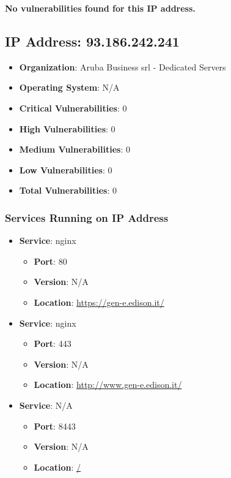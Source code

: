 \documentclass{article}
\begin{document}
\textbf{No vulnerabilities found for this IP address.}




\clearpage



\subsection{IP Address: 93.186.242.241}

\begin{itemize}
    \item \textbf{Organization}: Aruba Business srl - Dedicated Servers
    \item \textbf{Operating System}:  N/A 
    \item \textbf{Critical Vulnerabilities}: 0
    \item \textbf{High Vulnerabilities}: 0
    \item \textbf{Medium Vulnerabilities}: 0
    \item \textbf{Low Vulnerabilities}: 0
    \item \textbf{Total Vulnerabilities}: 0
\end{itemize}

\subsubsection*{Services Running on IP Address}

\begin{itemize}
    
        \item \textbf{Service}: nginx
        \begin{itemize}
            \item \textbf{Port}: 80
            \item \textbf{Version}:  N/A 
            \item \textbf{Location}: \href{ https://gen-e.edison.it/ }{ https://gen-e.edison.it/ }
        \end{itemize}
    
        \item \textbf{Service}: nginx
        \begin{itemize}
            \item \textbf{Port}: 443
            \item \textbf{Version}:  N/A 
            \item \textbf{Location}: \href{ http://www.gen-e.edison.it/ }{ http://www.gen-e.edison.it/ }
        \end{itemize}
    
        \item \textbf{Service}: N/A
        \begin{itemize}
            \item \textbf{Port}: 8443
            \item \textbf{Version}:  N/A 
            \item \textbf{Location}: \href{ / }{ / }
        \end{itemize}
    
\end{itemize}
\end{document}

